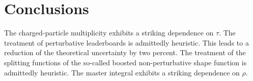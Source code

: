 \section{Conclusions}\label{sec:conclusions}

The charged-particle multiplicity exhibits a striking dependence on
$\tau$. The treatment of perturbative leaderboards is admittedly
heuristic. This leads to a reduction of the theoretical uncertainty by
two percent. The treatment of the splitting functions of the so-called
boosted non-perturbative shape function is admittedly heuristic. The
master integral exhibits a striking dependence on $\rho$.

